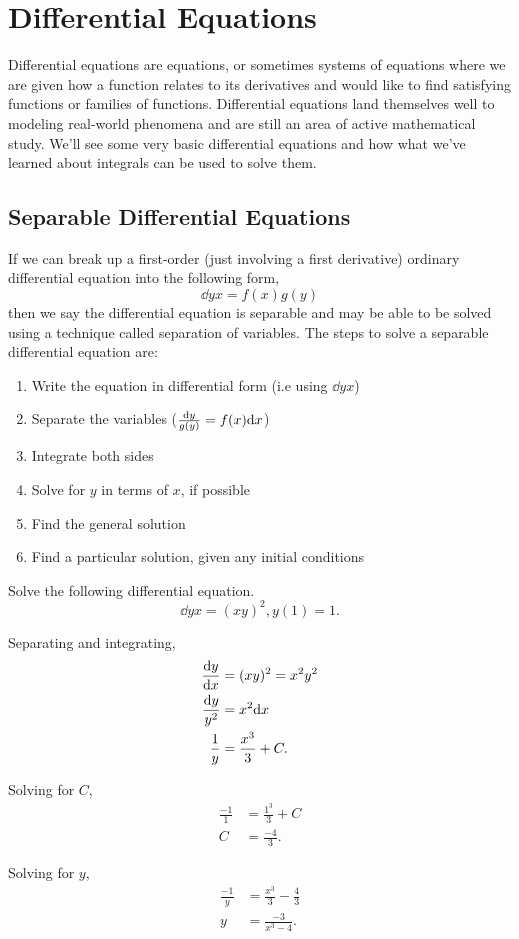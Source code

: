\section{Differential Equations}
Differential equations are equations, or sometimes systems of equations where we are given how a function relates to its derivatives and would like to find satisfying functions or families of functions.
Differential equations land themselves well to modeling real-world phenomena and are still an area of active mathematical study.
We'll see some very basic differential equations and how what we've learned about integrals can be used to solve them.

\subsection{Separable Differential Equations}
If we can break up a first-order (just involving a first derivative) ordinary differential equation into the following form,
\begin{equation*}
	\dd{y}{x} = f(x)g(y)
\end{equation*}
then we say the differential equation is separable and may be able to be solved using a technique called separation of variables.
The steps to solve a separable differential equation are:
\begin{enumerate}
	\item Write the equation in differential form (i.e using $\dd{y}{x}$)
	\item Separate the variables ($\frac{\mathrm{d} y}{g(y)}=f(x)\mathrm{d} x$)
	\item Integrate both sides
	\item Solve for $y$ in terms of $x$, if possible
	\item Find the general solution
	\item Find a particular solution, given any initial conditions
\end{enumerate}

\begin{example}
	Solve the following differential equation.
	\begin{equation*}
		\dd{y}{x} = (xy)^2, y(1)=1.
	\end{equation*}
\end{example}
\begin{answer}
	Separating and integrating,
	\begin{align*}
		\frac{\mathrm{d} y}{\mathrm{d} x} &= (xy)^2 = x^2y^2 \\
		\frac{\mathrm{d} y}{y^2} &= x^2\mathrm{d} x \\
		\frac{1}{y} &= \frac{x^3}{3} + C.
	\end{align*}
	
	Solving for $C$,
	\begin{align*}
		\frac{-1}{1} &= \frac{1^3}{3} + C \\
		C &= \frac{-4}{3}.
	\end{align*}
	
	Solving for $y$,
	\begin{align*}
		\frac{-1}{y} &= \frac{x^3}{3} - \frac{4}{3} \\
		y &= \frac{-3}{x^3 - 4}.
	\end{align*}
\end{answer}

